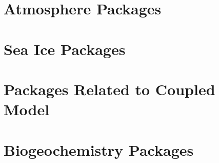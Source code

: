 \newpage


\newpage


\newpage


\newpage


\newpage


\newpage


\section{Atmosphere Packages}
\newpage


\newpage


\newpage


\section{Sea Ice Packages}
\newpage


\newpage


\newpage


\section{Packages Related to Coupled Model}
\newpage


\newpage


\newpage


\section{Biogeochemistry Packages}
\newpage


\newpage

